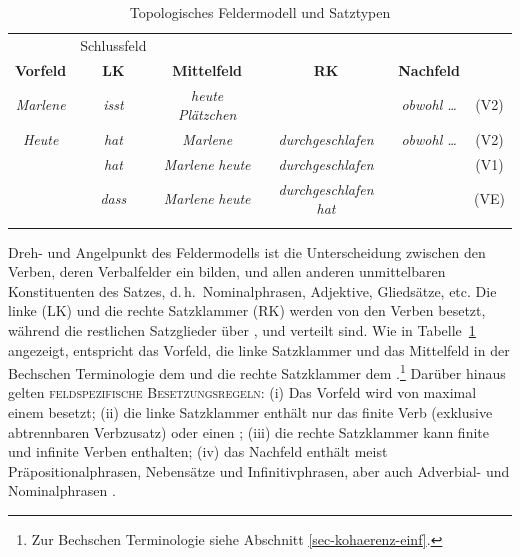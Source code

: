 \begin{table}[t]
\centering
\begin{tabular}{cccccc}
\lsptoprule
\multicolumn{3}{c}{Restfeld} & Schlussfeld \\
\cmidrule(r){1-3}\cmidrule(lr){4-4}
{\bf Vorfeld} & {\bf LK} & {\bf Mittelfeld} & {\bf RK} & {\bf Nachfeld} \\
\cmidrule[\heavyrulewidth]{1-5}
{\it Marlene} & {\it isst} & {\it heute Plätzchen} & & {\it obwohl \ldots} & (V2) \\
{\it Heute} & {\it hat} & {\it Marlene} & {\it durchgeschlafen} & {\it obwohl \ldots} & (V2) \\
& {\it hat} & {\it Marlene} {\it heute} & {\it durchgeschlafen} & & (V1) \\
 & {\it dass} & {\it Marlene} {\it heute} & {\it durchgeschlafen} {\it hat} & & (VE)\\
\lspbottomrule
\end{tabular}
\caption{\label{ex-feldermodell}Topologisches Feldermodell und Satztypen}
\end{table}

Dreh- und Angelpunkt des Feldermodells ist die Unterscheidung zwischen den Verben, deren Verbalfelder ein  bilden, und allen anderen unmittelbaren Konstituenten des Satzes, d.\,h.\ Nominalphrasen, Adjektive, Gliedsätze, etc. Die linke  (LK) und die rechte Satzklammer (RK) werden von den Verben besetzt, während die restlichen Satzglieder über ,  und  verteilt sind. Wie in Tabelle~\ref{ex-feldermodell} angezeigt, entspricht das Vorfeld, die linke Satzklammer und das Mittelfeld in der Bechschen Terminologie dem  und die rechte Satzklammer dem .\footnote{Zur Bechschen Terminologie siehe Abschnitt \ref{sec-kohaerenz-einf}.} Darüber hinaus gelten \textsc{feldspezifische Besetzungsregeln}: (i) Das Vorfeld wird von maximal einem  besetzt; (ii) die linke Satzklammer enthält nur das finite Verb (exklusive abtrennbaren Verbzusatz) oder einen ; (iii) die rechte Satzklammer kann finite und infinite Verben enthalten; (iv) das Nachfeld enthält meist Präpositionalphrasen, Nebensätze und Infinitivphrasen, aber auch Adverbial- und Nominalphrasen \citep[Kapitel~13]{Mueller:99}.

